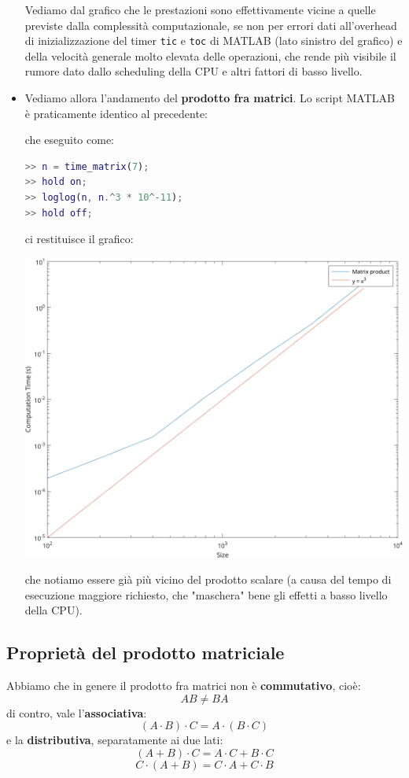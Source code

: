 \documentclass[a4paper,11pt]{article}
\begin{document}
\begin{itemize}
Vediamo dal grafico che le prestazioni sono effettivamente vicine a quelle previste dalla complessità computazionale, se non per errori dati all'overhead di inizializzazione del timer \lstinline|tic| e \lstinline|toc| di MATLAB (lato sinistro del grafico) e della velocità generale molto elevata delle operazioni, che rende più visibile il rumore dato dallo scheduling della CPU e altri fattori di basso livello.

\item Vediamo allora l'andamento del \textbf{prodotto fra matrici}. Lo script MATLAB è praticamente identico al precedente:

che eseguito come:
\begin{lstlisting}[language=MATLAB, style=codestyle]	
>> n = time_matrix(7);
>> hold on;
>> loglog(n, n.^3 * 10^-11);
>> hold off;
\end{lstlisting}

\begin{minipage}{\textwidth}
ci restituisce il grafico:
\begin{center}
	\includegraphics[scale=0.6]{../figures/matrix_perf.png}
\end{center}
che notiamo essere già più vicino del prodotto scalare (a causa del tempo di esecuzione maggiore richiesto, che "maschera" bene gli effetti a basso livello della CPU). 
\end{minipage}

\end{itemize}

\subsection{Proprietà del prodotto matriciale}
Abbiamo che in genere il prodotto fra matrici non è \textbf{commutativo}, cioè:
$$
A B \neq BA
$$
di contro, vale l'\textbf{associativa}:
$$
(A \cdot B) \cdot C = A \cdot (B\cdot C)
$$
e la \textbf{distributiva}, separatamente ai due lati:
$$
(A + B) \cdot C = A \cdot C + B \cdot C
$$
$$
C \cdot (A + B) = C \cdot A + C \cdot B 
$$
\end{document}
